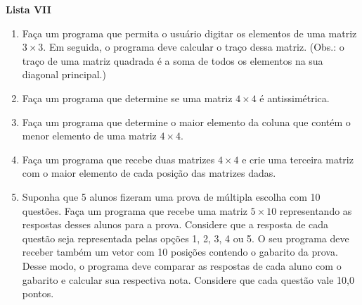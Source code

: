 \documentclass[12pt,a4paper]{article}
\begin{document}
\begin{center}
  \textbf{Lista VII}
\end{center}

\begin{enumerate}
   
  \item Faça um programa que permita o usuário digitar 
  os elementos de uma matriz $3\times 3$. Em seguida, o programa
  deve calcular o traço dessa matriz. (Obs.: o traço de uma matriz 
  quadrada é a soma de todos os elementos na sua diagonal principal.)

  \item Faça um programa que determine se uma matriz $4\times 4$
  é antissimétrica.
  
 
  \item Faça um programa que determine o maior elemento da 
  coluna que contém o menor elemento de uma matriz $4\times 4$.

  
  \item Faça um programa que recebe duas matrizes $4\times 4$ e crie uma
  terceira matriz com o maior elemento de cada posição das matrizes dadas.
  
  \item Suponha que 5 alunos fizeram uma prova de múltipla escolha 
  com 10 questões. Faça um programa que recebe uma matriz $5\times 10$
  representando as respostas desses alunos para a prova. Considere que 
  a resposta de cada questão seja representada pelas opções 1, 2, 3, 4
  ou 5. O seu programa deve receber também um vetor com 10 posições
  contendo o gabarito da prova. Desse modo, o programa deve comparar as
  respostas de cada aluno com o gabarito e calcular sua respectiva nota.
  Considere que cada questão vale 10,0 pontos.

\end{enumerate}
\end{document}
